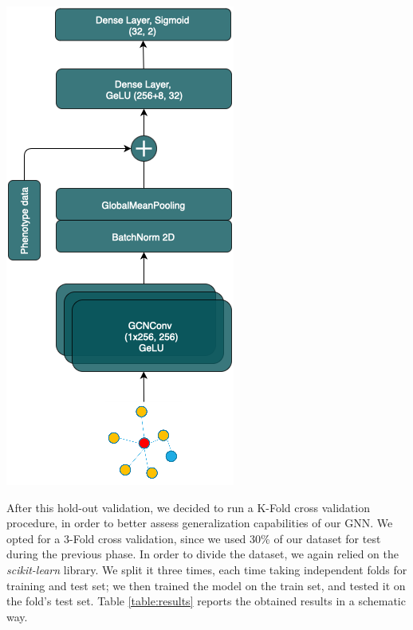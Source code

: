 \documentclass{article}
\newenvironment{Figure}
  {\par\medskip\noindent\minipage{\linewidth}}
  {\endminipage\par\medskip}
\begin{document}
\begin{multicols}{2}
\begin{Figure}
    \centering
    \includegraphics[width=0.8\linewidth]{assets/gnn.drawio-luca.png} 
    \label{fig:architecture}
\end{Figure}

\noindent
After this hold-out validation, we decided to run a K-Fold cross validation procedure, in order to better assess generalization capabilities of our GNN. We opted for a 3-Fold cross validation, since we used 30\% of our dataset for test during the previous phase. In order to divide the dataset, we again relied on the \textit{scikit-learn} library. We split it three times, each time taking independent folds for training and test set; we then trained the model on the train set, and tested it on the fold's test set. Table \ref{table:results} reports the obtained results in a schematic way.


\end{multicols}
\end{document}
